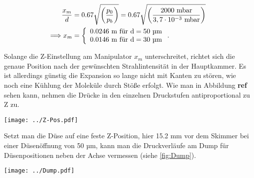 \begin{equation}
   \begin{split}
   \frac{x_m}{d} & =0.67 \sqrt{\left(\frac{p_0}{p_b}\right)} = 0.67 \sqrt{\left(\frac{2000 \ \textmd{mbar}}{3,7 \cdot 10^{-3}\ \textmd{mbar}}\right)}\\ 
   \Longrightarrow x_m  & =  
   \left\{ %
   \begin{array}{l}
   0.0246\ \textmd{m} \textmd{ für d}= 50 \textmd{ µm} \\ 
   0.0146\ \textmd{m} \textmd{ für d}= 30 \textmd{ µm}
   \end{array}
   \right. .
   \end{split}
\end{equation}

Solange die Z-Einstellung am Manipulator $x_m$ unterschreitet, richtet sich die genaue Position nach der gewünschten Strahlintensität in der Hauptkammer. Es ist allerdings günstig die Expansion so lange nicht mit Kanten zu stören, wie noch eine Kühlung der Moleküle durch Stöße erfolgt. Wie man in Abbildung \textbf{ref} sehen kann, nehmen die Drücke in den einzelnen Druckstufen antiproportional zu Z zu. 

\begin{center}
\begin{minipage}{\linewidth}
\centering
\texttt{[image: ../Z-Pos.pdf]}%
 \label{fig:Dump}
\end{minipage} 
\end{center} 

Setzt man die Düse auf eine feste Z-Position, hier 15.2 mm vor dem Skimmer bei einer Düsenöffnung von 50 µm, kann man die Druckverläufe am Dump für Düsenpositionen neben der Achse vermessen (siehe \ref{fig:Dump}).

\begin{center}
\begin{minipage}{\linewidth}
\centering
\texttt{[image: ../Dump.pdf]}%
 \label{fig:Dump}
\end{minipage} 
\end{center} 



